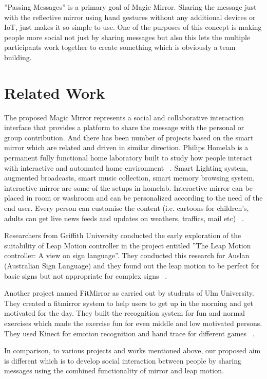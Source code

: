 \documentclass{sigchi-ext}
\begin{document}
''Passing Messages'' is a primary goal of Magic Mirror. Sharing the message just with the reflective mirror using hand gestures without any additional devices or IoT, just makes it so simple to use. One of the purposes of this concept is making people more social not just by sharing messages but also this lets the multiple participants work together to create something which is obviously a team building.

\section{Related Work}
The proposed Magic Mirror represents a social and collaborative interaction interface that provides a platform to share the message with the personal or group contribution. And there has been number of projects based on the smart mirror which are related and driven in similar direction. Philips Homelab is a permanent fully functional home laboratory built to study how people interact with interactive and automated home environment ~\cite{noauthor_philips_2008}. Smart Lighting system, augmented broadcasts, smart music collection, smart memory browsing system, interactive mirror are some of the setups in homelab. Interactive mirror can be placed in room or washroom and can be personalized according to the need of the end user. Every person can customise the content (i.e. cartoons for children's, adults can get live news feeds and updates on weathers, traffics, mail etc) ~\cite{henk_hagenbeuk_homelab:_nodate}.

Researchers from Griffith University conducted the early exploration of the suitability of Leap Motion controller in the project entitled ''The Leap Motion controller: A view on sign language''. They conducted this research for Auslan (Australian Sign Language) and they found out the leap motion to be perfect for basic signs but not appropriate for complex signs ~\cite{potter_leap_2013}.

Another project named FitMirror as carried out by students of Ulm University. They created a fitmirror system to help users to get up in the morning and get motivated for the day. They built the recognition system for fun and normal exercises which made the exercise fun for even middle and low motivated persons. They used Kinect for emotion recognition and hand trace for different games ~\cite{besserer_fitmirror:_2016}.

In comparison, to various projects and works mentioned above, our proposed aim is different which is to develop social interaction between people by sharing messages using the combined functionality of mirror and leap motion.
\end{document}
